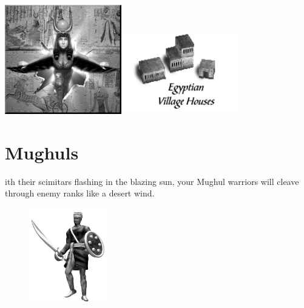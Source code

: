 \begin{center}
	\includegraphics[width=2in]{Aisis}\hspace{1pt}\includegraphics[width=2in]{Iegyptianhouse}
\end{center}

\clearpage

\section{Mughuls}


ith their scimitars flashing in the blazing sun, your Mughul warriors will cleave through enemy ranks like a desert wind.

\begin{figure}
	\begin{center}
		\vspace{-20pt}
		\includegraphics[width=0.3\textwidth]{Amughal}
	\end{center}
	\vspace{-20pt}
\end{figure}

